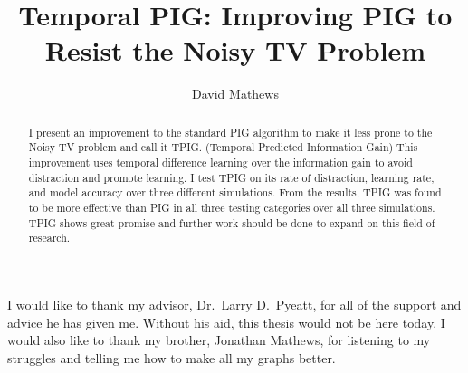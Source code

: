 \documentclass[12pt]{thesis}
\title{Temporal PIG: Improving PIG to Resist the Noisy TV Problem}
\author{David Mathews}
\begin{document}
\maketitle

\makecopyright %

\preliminaries

\begin{abstract}
I present an improvement to the standard PIG algorithm to make it less prone to the Noisy TV problem and call it TPIG. (Temporal Predicted Information Gain) This improvement uses temporal difference learning over the information gain to avoid distraction and promote learning. I test TPIG on its rate of distraction, learning rate, and model accuracy over three different simulations. From the results, TPIG was found to be more effective than PIG in all three testing categories over all three simulations. TPIG shows great promise and further work should be done to expand on this field of research.
\end{abstract}

\begin{acknowledgments}
  I would like to thank my advisor, Dr.\ Larry D.\ Pyeatt, for all of the support and advice he has given me. Without his aid, this thesis would not be here today. I would also like to thank my brother, Jonathan Mathews, for listening to my struggles and telling me how to make all my graphs better.
\end{acknowledgments}


\tableofcontents


\listoffigures



\end{document}

